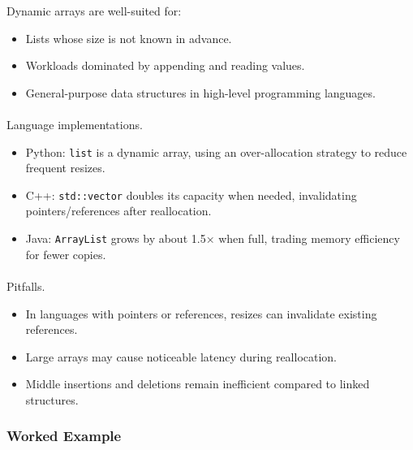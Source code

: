 \documentclass[
  letterpaper,
  DIV=11,
  numbers=noendperiod]{scrreprt}
\makeatletter
\let\oldparagraph\paragraph
\renewcommand{\paragraph}{
    \@ifstar
      \xxxParagraphStar
      \xxxParagraphNoStar
  }
\newcommand{\xxxParagraphStar}[1]{\oldparagraph*{#1}\mbox{}}
\newcommand{\xxxParagraphNoStar}[1]{\oldparagraph{#1}\mbox{}}
\providecommand{\tightlist}{%
  \setlength{\itemsep}{0pt}\setlength{\parskip}{0pt}}
\makeatother
\begin{document}
Dynamic arrays are well-suited for:

\begin{itemize}
\tightlist
\item
  Lists whose size is not known in advance.
\item
  Workloads dominated by appending and reading values.
\item
  General-purpose data structures in high-level programming languages.
\end{itemize}

\paragraph{Language implementations.}\label{language-implementations.}

\begin{itemize}
\tightlist
\item
  Python: \texttt{list} is a dynamic array, using an over-allocation
  strategy to reduce frequent resizes.
\item
  C++: \texttt{std::vector} doubles its capacity when needed,
  invalidating pointers/references after reallocation.
\item
  Java: \texttt{ArrayList} grows by about 1.5× when full, trading memory
  efficiency for fewer copies.
\end{itemize}

\paragraph{Pitfalls.}\label{pitfalls.-1}

\begin{itemize}
\tightlist
\item
  In languages with pointers or references, resizes can invalidate
  existing references.
\item
  Large arrays may cause noticeable latency during reallocation.
\item
  Middle insertions and deletions remain inefficient compared to linked
  structures.
\end{itemize}

\subsubsection{Worked Example}\label{worked-example-3}
\end{document}
